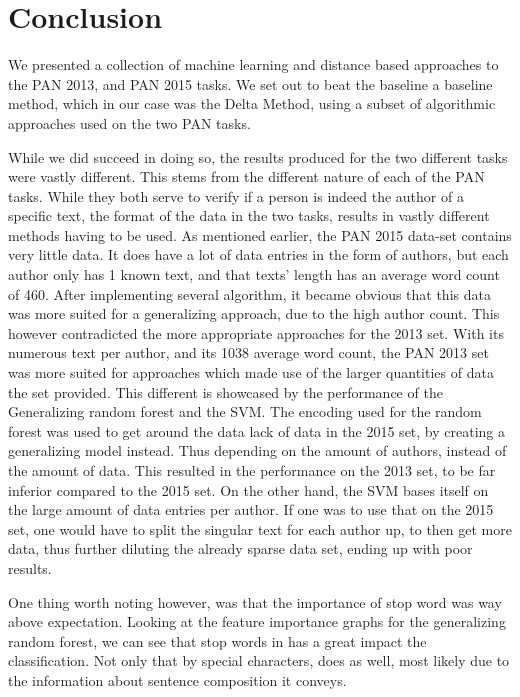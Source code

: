 \section{Conclusion} \label{sec:conclusion} 

We presented a collection of machine learning and distance based approaches
to the PAN 2013, and PAN 2015 tasks. We set out to beat the baseline a baseline
method, which in our case was the Delta Method, using a subset of algorithmic
approaches used on the two PAN tasks.

While we did succeed in doing so, the results produced for the two different
tasks were vastly different. This stems from the different nature of each of
the PAN tasks. While they both serve to verify if a person is indeed the author
of a specific text, the format of the data in the two tasks, results in vastly
different methods having to be used. As mentioned earlier, the PAN 2015 data-set
contains very little data. It does have a lot of data entries in the form of
authors, but each author only has 1 known text, and that texts' length has an
average word count of 460. After implementing several algorithm, it became
obvious that this data was more suited for a generalizing approach, due to the
high author count. This however contradicted the more appropriate approaches
for the 2013 set. With its numerous text per author, and its 1038 average word
count, the PAN 2013 set was more suited for approaches which made use of the
larger quantities of data the set provided. This different is showcased by the
performance of the Generalizing random forest and the SVM. The encoding used
for the random forest was used to get around the data lack of data in the 2015
set, by creating a generalizing model instead. Thus depending on the amount of
authors, instead of the amount of data. This resulted in the performance on the
2013 set, to be far inferior compared to the 2015 set. On the other hand, the
SVM bases itself on the large amount of data entries per author. If one was to
use that on the 2015 set, one would have to split the singular text for each
author up, to then get more data, thus further diluting the already sparse data
set, ending up with poor results.

One thing worth noting however, was that the importance of stop word was way 
above expectation. Looking at the feature importance graphs for the 
generalizing random forest, we can see that stop words in has
a great impact the classification. Not only that by special characters,
does as well, most likely due to the information about sentence composition it
conveys.



